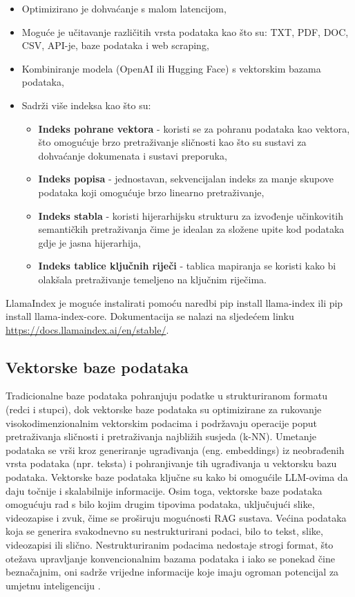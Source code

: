 \documentclass[]{foi}
\begin{document}
\begin{itemize}
    \item Optimizirano je dohvaćanje s malom latencijom,
    \item Moguće je učitavanje različitih vrsta podataka kao što su: TXT, PDF, DOC, CSV, API-je, baze podataka i web scraping,
    \item Kombiniranje modela (OpenAI ili Hugging Face) s vektorskim bazama podataka,
    \item Sadrži više indeksa kao što su:
    \begin{itemize}
        \item \textbf{Indeks pohrane vektora} - koristi se za pohranu podataka kao vektora, što omogućuje brzo pretraživanje sličnosti kao što su sustavi za dohvaćanje dokumenata i sustavi preporuka,
        \item \textbf{Indeks popisa} - jednostavan, sekvencijalan indeks za manje skupove podataka koji omogućuje brzo linearno pretraživanje,
        \item \textbf{Indeks stabla} - koristi hijerarhijsku strukturu za izvođenje učinkovitih semantičkih pretraživanja čime je idealan za složene upite kod podataka gdje je jasna hijerarhija,
        \item \textbf{Indeks tablice ključnih riječi} - tablica mapiranja se koristi kako bi olakšala pretraživanje temeljeno na ključnim riječima.
    \end{itemize}
\end{itemize}

LlamaIndex je moguće instalirati pomoću naredbi pip install llama-index ili pip install llama-index-core. Dokumentacija se nalazi na sljedećem linku \url{https://docs.llamaindex.ai/en/stable/}.

\subsection{Vektorske baze podataka}
Tradicionalne baze podataka pohranjuju podatke u strukturiranom formatu (redci i stupci), dok vektorske baze podataka su optimizirane za rukovanje
visokodimenzionalnim vektorskim podacima i podržavaju operacije poput pretraživanja sličnosti i pretraživanja najbližih susjeda (k-NN). Umetanje
podataka se vrši kroz generiranje ugrađivanja (eng. embeddings) iz neobrađenih vrsta podataka (npr. teksta) i pohranjivanje tih ugrađivanja u vektorsku bazu podataka.
Vektorske baze podataka ključne su kako bi omogućile LLM-ovima da daju točnije i skalabilnije informacije. 
Osim toga, vektorske baze podataka omogućuju rad s bilo kojim drugim tipovima podataka, uključujući slike, videozapise i zvuk, čime se proširuju mogućnosti RAG sustava.
Većina podataka koja se generira svakodnevno su nestrukturirani podaci, bilo to tekst, slike, videozapisi ili slično. 
Nestrukturiranim podacima nedostaje strogi format, što otežava upravljanje konvencionalnim bazama podataka i iako se ponekad čine beznačajnim,
oni sadrže vrijedne informacije koje imaju ogroman potencijal za umjetnu inteligenciju \cite{aquino2025vector}.
\end{document}
